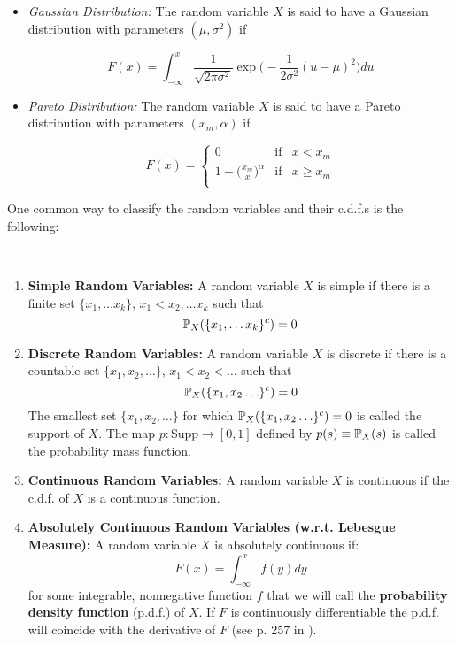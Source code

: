 \documentclass[11pt]{article} %
\begin{document}
\begin{itemize}
\item \emph{Gaussian Distribution:} The random variable $X$ is said to have a Gaussian distribution with parameters $(\mu, \sigma^2)$ if 

$$F(x) = \int_{-\infty}^{x} \frac{1}{\sqrt{2 \pi \sigma^2} } \exp\Big(-\frac{1}{2 \sigma^2} (u-\mu)^2 \Big) du $$ 

\item \emph{Pareto Distribution:} The random variable $X$ is said to have a Pareto distribution with parameters $(x_m, \alpha)$ if 

\begin{equation*}
F(x) = 
\left\{
\begin{array}{ccc}
0  & \text{if}  & x < x_m   \\
1-\Big(\frac{x_m}{x} \Big)^{\alpha} & \text{if}  & x \geq x_m   \\
\end{array}
\right.
\end{equation*}

\end{itemize}

One common way to classify the random variables and their c.d.f.s is the following:

\begin{definition}  \:\
\begin{enumerate}
\item \textbf{Simple Random Variables:} A random variable $X$ is simple if there is a finite set $\{x_1, \ldots x_k\}$, $x_1<x_2, \ldots x_k$ such that 
$$\mathbb{P}_{X}(\{x_1, \ldots x_k\}^c)=0$$
\item \textbf{Discrete Random Variables:} A random variable $X$ is discrete if there is a countable set $\{x_1, x_2, \ldots\}$, $x_1<x_2<\ldots$ such that 
$$\mathbb{P}_{X}(\{x_1, x_2\ldots \}^c)=0$$
The smallest set $\{x_1, x_2, \ldots\}$ for which $\mathbb{P}_{X}(\{x_1, x_2\ldots \}^c)=0$ is called the support of $X$. The map $p: \text{Supp} \rightarrow [0,1]$ defined by $p(s)\equiv\mathbb{P}_{X}(s)$ is called the probability mass function. 
\item \textbf{Continuous Random Variables:} A random variable $X$ is continuous if the c.d.f. of $X$ is a continuous function.
\item \textbf{Absolutely Continuous Random Variables (w.r.t. Lebesgue Measure):} A random variable $X$ is absolutely continuous if:
$$F(x) = \int_{-\infty}^{x} f(y)dy $$
for some integrable, nonnegative function $f$ that we will call the \textbf{probability density function} (p.d.f.) of $X$. If $F$ is continuously differentiable the p.d.f. will coincide with the derivative of $F$ (see p. 257 in \cite{Billingsley95}).
\end{enumerate}

\end{definition}
\end{document}

